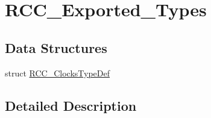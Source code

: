 \hypertarget{group___r_c_c___exported___types}{}\section{R\+C\+C\+\_\+\+Exported\+\_\+\+Types}
\label{group___r_c_c___exported___types}
\subsection*{Data Structures}
\begin{DoxyCompactItemize}
\item 
struct \mbox{\hyperlink{struct_r_c_c___clocks_type_def}{R\+C\+C\+\_\+\+Clocks\+Type\+Def}}
\end{DoxyCompactItemize}


\subsection{Detailed Description}
